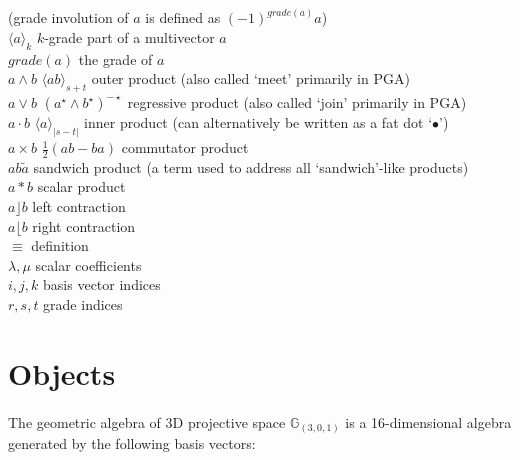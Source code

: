 \documentclass{article}
\begin{document}
\begin{tabbing}
    \> \> (grade involution of $a$ is defined as $(-1)^{grade(a)}a$) \\
    $\langle a \rangle_{k}$ \> \> $k$-grade part of a multivector $a$\\
    $grade(a)$ \> \> the grade of $a$\\
    $a \wedge b$ \> $\langle ab \rangle_{ s+t }$ \> outer product (also called `meet' primarily in PGA)\\
    $a \vee b$ \> $(a^{\star} \wedge b^{\star})^{-\star}$ \> regressive product (also called `join' primarily in PGA)\\
    $a \cdot b$ \> $\langle a \rangle_{\vert s-t \vert}$ \> inner product (can alternatively be written as a fat dot `$\bullet$')\\
    $a \times b$ \> $\frac{1}{2}(ab - ba)$ \> commutator product\\
    $ab\tilde{a}$ \> \> sandwich product (a term used to address all `sandwich'-like products)\\
    $a * b$ \> \> scalar product\\
    $a \rfloor b$ \> \> left contraction\\
    $a \lfloor b$ \> \> right contraction\\
    $\equiv$ \> \> definition\\
    $\lambda, \mu$ \> \> scalar coefficients\\
    $i, j, k$ \> \> basis vector indices\\
    $r, s, t$ \> \> grade indices\\
\end{tabbing}

\section{Objects}

\paragraph{}The geometric algebra of 3D projective space $\mathbb{G}_{(3,0,1)}$ is a 16-dimensional algebra generated by the following basis vectors:
\end{document}
